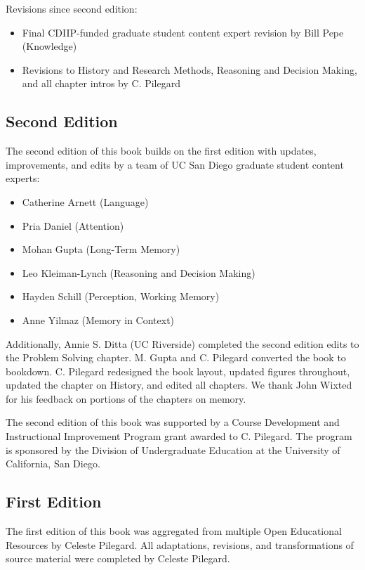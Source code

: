 \documentclass[
]{krantz}
\providecommand{\tightlist}{%
  \setlength{\itemsep}{0pt}\setlength{\parskip}{0pt}}
\begin{document}
Revisions since second edition:

\begin{itemize}
\tightlist
\item
  Final CDIIP-funded graduate student content expert revision by Bill Pepe (Knowledge)
\item
  Revisions to History and Research Methods, Reasoning and Decision Making, and all chapter intros by C. Pilegard
\end{itemize}

\subsection*{Second Edition}\label{second-edition}


The second edition of this book builds on the first edition with updates, improvements, and edits by a team of UC San Diego graduate student content experts:

\begin{itemize}
\tightlist
\item
  Catherine Arnett (Language)
\item
  Pria Daniel (Attention)
\item
  Mohan Gupta (Long-Term Memory)
\item
  Leo Kleiman-Lynch (Reasoning and Decision Making)
\item
  Hayden Schill (Perception, Working Memory)
\item
  Anne Yilmaz (Memory in Context)
\end{itemize}

Additionally, Annie S. Ditta (UC Riverside) completed the second edition edits to the Problem Solving chapter. M. Gupta and C. Pilegard converted the book to bookdown. C. Pilegard redesigned the book layout, updated figures throughout, updated the chapter on History, and edited all chapters. We thank John Wixted for his feedback on portions of the chapters on memory.

The second edition of this book was supported by a Course Development and Instructional Improvement Program grant awarded to C. Pilegard. The program is sponsored by the Division of Undergraduate Education at the University of California, San Diego.

\subsection*{First Edition}\label{first-edition}


The first edition of this book was aggregated from multiple Open Educational Resources by Celeste Pilegard. All adaptations, revisions, and transformations of source material were completed by Celeste Pilegard.
\end{document}
